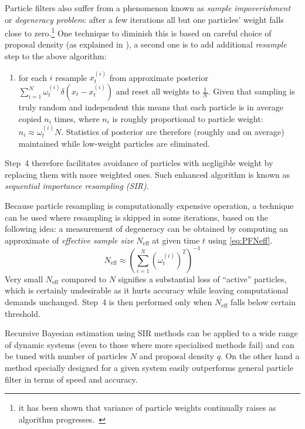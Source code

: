 Particle filters also suffer from a phenomenon known as \emph{sample impoverishment} or
\emph{degeneracy problem}: after a few iterations all but one particles' weight falls close to
zero.\footnote{it has been shown that variance of particle weights continually raises as algorithm
progresses.~\cite{AruMasGor:02}}
One technique to diminish this is based on careful choice of proposal density (as explained in
\cite{AruMasGor:02}), a second one is to add additional \emph{resample} step to the above
algorithm:
\begin{enumerate}[resume] %
	\item for each \(i\) resample \(x_t^{(i)}\) from approximate posterior {\pdf}
		\(\sum_{i=1}^N \omega_t^{(i)} \delta(x_t - x_t^{(i)})\) and reset all weights to \(\frac{1}{N}\).
		Given that sampling is truly random and independent this means that each particle is in
		average copied \(n_i\) times, where \(n_i\) is roughly proportional to particle weight:
		\(n_i \approx \omega_t^{(i)} N\). Statistics of posterior {\pdf} are therefore (roughly and
		on average) maintained while low-weight particles are eliminated.
\end{enumerate}
Step~4 therefore facilitates avoidance of particles with negligible weight by replacing them with more weighted
ones. Such enhanced algorithm is known as \emph{sequential importance resampling (SIR)}.

Because particle resampling is computationally expensive operation, a technique can be used where
resampling is skipped in some iterations, based on the following idea:
a measurement of degeneracy can be obtained by computing an
approximate of \emph{effective sample size} \(N_{\text{eff}}\) at given time \(t\) using
\eqref{eq:PFNeff}.~\cite{AruMasGor:02}
\begin{equation} \label{eq:PFNeff}
	N_{\text{eff}} \approx \left( \sum_{i=1}^N \left( \omega_t^{(i)} \right)^2 \right)^{-1}
\end{equation}
Very small \(N_{\text{eff}}\) compared to \(N\) signifies a substantial loss of ``active'' particles,
which is certainly undesirable as it hurts accuracy while leaving computational demands unchanged.
Step~4 is then performed only when \(N_{\text{eff}}\) falls below certain threshold.

Recursive Bayesian estimation using SIR methods can be applied to a wide range of dynamic systems
(even to those where more specialised methods fail) and can be tuned with number of particles \(N\) and
proposal density \(q\). On the other hand a method specially designed for a given system easily
outperforms general particle filter in terms of speed and accuracy.

